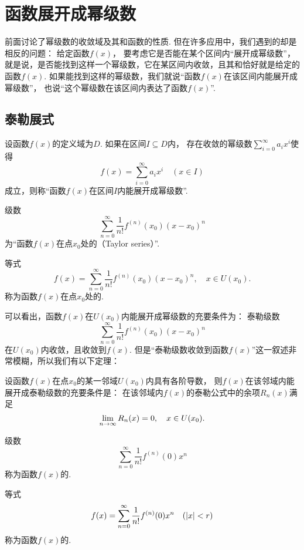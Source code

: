 \section{函数展开成幂级数}
前面讨论了幂级数的收敛域及其和函数的性质.
但在许多应用中，我们遇到的却是相反的问题：
给定函数\(f(x)\)，%
要考虑它是否能在某个区间内“展开成幂级数”，%
就是说，是否能找到这样一个幂级数，它在某区间内收敛，且其和恰好就是给定的函数\(f(x)\).
如果能找到这样的幂级数，我们就说“函数\(f(x)\)在该区间内能展开成幂级数”，%
也说“这个幂级数在该区间内表达了函数\(f(x)\)”.

\subsection{泰勒展式}
\begin{definition}
设函数\(f(x)\)的定义域为\(D\).
如果在区间\(I \subseteq D\)内，%
存在收敛的幂级数\(\sum\limits_{i=0}^\infty {a_i x^i}\)使得\[
f(x) = \sum\limits_{i=0}^\infty {a_i x^i}
\quad(x \in I)
\]成立，则称“函数\(f(x)\)在区间\(I\)内能展开成幂级数”.
\end{definition}

\begin{definition}
级数\[
\sum\limits_{n=0}^\infty \frac{1}{n!} f^{(n)}(x_0) (x-x_0)^n
\]
为“函数\(f(x)\)在点\(x_0\)处的（Taylor series）”.

等式\[
f(x) = \sum\limits_{n=0}^\infty {\frac{1}{n!} f^{(n)}(x_0) (x-x_0)^n},
\quad x \in U(x_0).
\]称为函数\(f(x)\)在点\(x_0\)处的.
\end{definition}

可以看出，函数\(f(x)\)在\(U(x_0)\)内能展开成幂级数的充要条件为：
泰勒级数\[
\sum\limits_{n=0}^\infty {\frac{1}{n!} f^{(n)}(x_0) (x-x_0)^n}
\]在\(U(x_0)\)内收敛，且收敛到\(f(x)\).
但是“泰勒级数收敛到函数\(f(x)\)”这一叙述非常模糊，所以我们有以下定理：
\begin{theorem}
设函数\(f(x)\)在点\(x_0\)的某一邻域\(U(x_0)\)内具有各阶导数，%
则\(f(x)\)在该邻域内能展开成泰勒级数的充要条件是：
在该邻域内\(f(x)\)的泰勒公式中的余项\(R_n(x)\)满足\[
\lim\limits_{n\to\infty} R_n(x) = 0,
\quad x \in U(x_0).
\]
\end{theorem}

\begin{definition}
级数\[
\sum\limits_{n=0}^\infty \frac{1}{n!} f^{(n)}(0) x^n
\]称为函数\(f(x)\)的.

等式\[
f(x) = \sum\limits_{n=0}^\infty {\frac{1}{n!} f^{(n)}(0) x^n}
\quad(\abs{x} < r)
\]称为函数\(f(x)\)的.
\end{definition}

